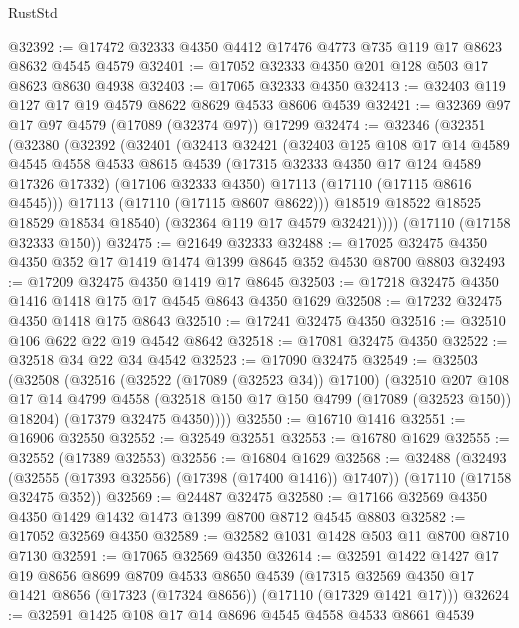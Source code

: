 \begin{lexlean}{RustStd}
\begin{coremodule}
@32392 := @17472 @32333 @4350 @4412 @17476 @4773 @735 @119 @17 @8623 @8632 @4545 @4579
@32401 := @17052 @32333 @4350 @201 @128 @503 @17 @8623 @8630 @4938
@32403 := @17065 @32333 @4350
@32413 := @32403 @119 @127 @17 @19 @4579 @8622 @8629 @4533 @8606 @4539
@32421 := @32369 @97 @17 @97 @4579 (@17089 (@32374 @97)) @17299
@32474 := @32346
    (@32351
      (@32380
        (@32392
          (@32401
            (@32413
              @32421
              (@32403
                @125
                @108
                @17
                @14
                @4589
                @4545
                @4558
                @4533
                @8615
                @4539
                (@17315 @32333 @4350 @17 @124 @4589 @17326 @17332)
                (@17106 @32333 @4350)
                @17113
                (@17110 (@17115 @8616 @4545)))
              @17113
              (@17110 (@17115 @8607 @8622)))
            @18519
            @18522
            @18525
            @18529
            @18534
            @18540)
          (@32364 @119 @17 @4579 @32421))))
    (@17110 (@17158 @32333 @150))
@32475 := @21649 @32333
@32488 := @17025 @32475 @4350 @4350 @352 @17 @1419 @1474 @1399 @8645 @352 @4530 @8700 @8803
@32493 := @17209 @32475 @4350 @1419 @17 @8645
@32503 := @17218 @32475 @4350 @1416 @1418 @175 @17 @4545 @8643 @4350 @1629
@32508 := @17232 @32475 @4350 @1418 @175 @8643
@32510 := @17241 @32475 @4350
@32516 := @32510 @106 @622 @22 @19 @4542 @8642
@32518 := @17081 @32475 @4350
@32522 := @32518 @34 @22 @34 @4542
@32523 := @17090 @32475
@32549 := @32503
    (@32508
      (@32516
        (@32522 (@17089 (@32523 @34)) @17100)
        (@32510
          @207
          @108
          @17
          @14
          @4799
          @4558
          (@32518 @150 @17 @150 @4799 (@17089 (@32523 @150)) @18204)
          (@17379 @32475 @4350))))
@32550 := @16710 @1416
@32551 := @16906 @32550
@32552 := @32549 @32551
@32553 := @16780 @1629
@32555 := @32552 (@17389 @32553)
@32556 := @16804 @1629
@32568 := @32488
    (@32493 (@32555 (@17393 @32556) (@17398 (@17400 @1416)) @17407))
    (@17110 (@17158 @32475 @352))
@32569 := @24487 @32475
@32580 := @17166 @32569 @4350 @4350 @1429 @1432 @1473 @1399 @8700 @8712 @4545 @8803
@32582 := @17052 @32569 @4350
@32589 := @32582 @1031 @1428 @503 @11 @8700 @8710 @7130
@32591 := @17065 @32569 @4350
@32614 := @32591
    @1422
    @1427
    @17
    @19
    @8656
    @8699
    @8709
    @4533
    @8650
    @4539
    (@17315 @32569 @4350 @17 @1421 @8656 (@17323 (@17324 @8656)) (@17110 (@17329 @1421 @17)))
@32624 := @32591 @1425 @108 @17 @14 @8696 @4545 @4558 @4533 @8661 @4539

\end{coremodule}
\end{lexlean}
